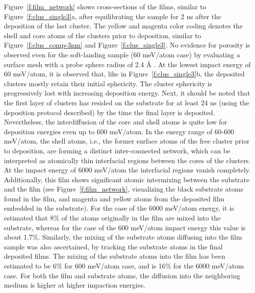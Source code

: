 \begin{selfcite}
Figure~\ref{f:film_network} shows cross-sections of the films, similar to Figure~\ref{f:clus_single3}a, after equilibrating the sample for 2 ns after the deposition of the last cluster. The yellow and magenta color coding denotes the shell and core atoms of the clusters prior to deposition, similar to Figure~\ref{f:clus_comp-3nm} and Figure~\ref{f:clus_single3}. No evidence for porosity is observed even for the soft-landing sample (60 meV/atom case) by evaluating a surface mesh with a probe sphere radius of 2.4 \r{A} \cite{Stukowski2010a,Stukowski2014}. At the lowest impact energy of 60 meV/atom, it is observed that, like in Figure~\ref{f:clus_single3}b, the deposited clusters mostly retain their initial sphericity. The cluster sphericity is progressively lost with increasing deposition energy. Next, it should be noted that the first layer of clusters has resided on the substrate for at least 24 ns (using the deposition protocol described) by the time the final layer is deposited. Nevertheless, the interdiffusion of the core and shell atoms is quite low for deposition energies even up to 600 meV/atom. In the energy range of 60-600 meV/atom, the shell atoms, i.e., the former surface atoms of the free cluster prior to deposition, are forming a distinct inter-connected network, which can be interpreted as atomically thin interfacial regions between the cores of the clusters. At the impact energy of 6000 meV/atom the interfacial regions vanish completely. Additionally, this film shows significant atomic intermixing between the substrate and the film (see Figure~\ref{f:film_network}, visualizing the black substrate atoms found in the film, and magenta and yellow atoms from the deposited film embedded in the substrate). For the case of the 6000 meV/atom energy, it is estimated that 8\% of the atoms originally in the film are mixed into the substrate, whereas for the case of the 600 meV/atom impact energy this value is about 1.7\%. Similarly, the mixing of the substrate atoms diffusing into the film sample was also ascertained, by tracking the substrate atoms in the final deposited films. The mixing of the substrate atoms into the film has been estimated to be 6\% for 600 meV/atom case, and is 16\% for the 6000 meV/atom case. For both the film and substrate atoms, the diffusion into the neighboring medium is higher at higher impaction energies. \par
	

\end{selfcite}
